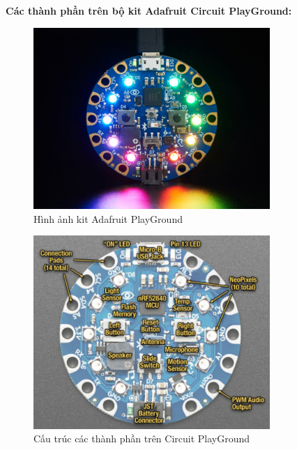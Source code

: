 \textbf{Các thành phần trên bộ kit Adafruit Circuit PlayGround\cite{ada_overview}:}

\begin{figure}[!ht]
		\centering
 		\includegraphics[width=0.8\textwidth]{images/ada.png}
		\caption{Hình ảnh kit Adafruit PlayGround}
		\label{ada}
\end{figure}

\begin{figure}[!ht]
		\centering
 		\includegraphics[width=0.8\textwidth]{images/detail_ada.png}
		\caption{Cấu trúc các thành phần trên Circuit PlayGround}
		\label{detail_ada}
\end{figure}


